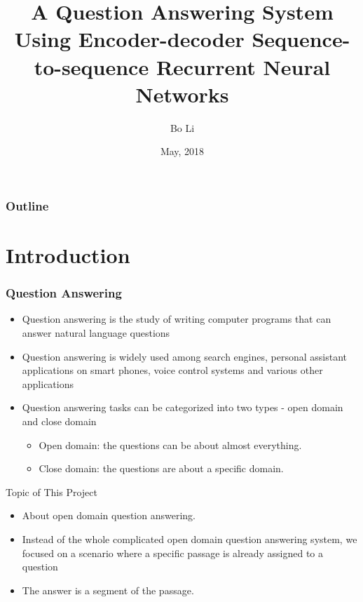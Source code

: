 \documentclass{beamer}
\begin{document}
\raggedright

\title{A Question Answering System Using Encoder-decoder Sequence-to-sequence Recurrent Neural Networks}
\author{Bo Li}
\date{May, 2018}

\begin{frame}
\titlepage

\end{frame}

\begin{frame}

  \frametitle{Outline}

  \tableofcontents[hideallsubsections]

\end{frame}



\section{Introduction}

\begin{frame} \frametitle{Question Answering}
    \begin{itemize}
        \item Question answering is the study of writing computer programs that can answer natural language questions
        \item Question answering is widely used among search engines, personal assistant applications on smart phones, voice control systems and various other applications
        \item  Question answering tasks can be categorized into two types - open domain and close domain
            \begin{itemize}
                \item  Open domain: the questions can be about almost everything.
                \item Close domain: the questions are about a specific domain.
            \end{itemize}
    \end{itemize}
\end{frame}


\begin{frame}{Topic of This Project}
    \begin{itemize}
        \item About open domain question answering.
        \item Instead of the whole complicated open domain question answering system, we focused on a scenario where a specific passage is already assigned to a question
        \item The answer is a segment of the passage.

    \end{itemize}

\end{frame}
\end{document}
